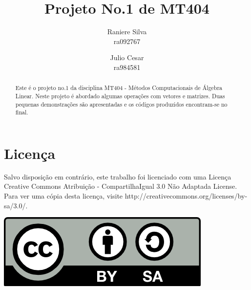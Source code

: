 \documentclass[12pt,a4paper]{article}
\begin{document}
\title{Projeto No.1 de MT404}
\author{Raniere Silva \\ ra092767  \and Julio Cesar \\ ra984581}
\maketitle
\begin{abstract}
    Este \'{e} o projeto no.1 da disciplina MT404 - M\'{e}todos Computacionais de \'{A}lgebra Linear. Neste projeto \'{e} abordado algumas opera\c{c}\~{o}es com vetores e matrizes. Duas pequenas demonstra\c{c}\~{o}es s\~{a}o apresentadas e os c\'{o}digos produzidos encontram-se no final.
\end{abstract}
\tableofcontents
\lstlistoflistings
\section*{Licen\c{c}a}
Salvo disposi\c{c}\~{a}o em contr\'{a}rio, este trabalho foi licenciado com uma Licen\c{c}a Creative Commons Atribui\c{c}\~{a}o - CompartilhaIgual 3.0 N\~{a}o Adaptada License. Para ver uma c\'{o}pia desta licen\c{c}a, visite http://creativecommons.org/licenses/by-sa/3.0/.
\begin{center}
    \includegraphics{../figuras/cc-by-sa.png}
\end{center}
\newpage
\end{document}
